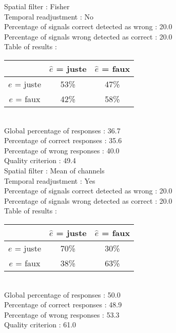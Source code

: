 Spatial filter : Fisher \\
Temporal readjustment : No \\
Percentage of signals correct detected as wrong :   20.0 \\
Percentage of signals wrong detected as correct :   20.0 \\
Table of results : \\
\begin{tabular}{|c|c|c|}
\hline				& $\hat{e}$ = juste & $\hat{e}$ = faux \\
\hline  $e$ = juste	&     53\%			&     47\%		\\
\hline  $e$ = faux	&     42\%			&     58\%		\\
\hline
\end{tabular}\\
Global percentage of responses :   36.7 \\
Percentage of correct responses :   35.6 \\
Percentage of wrong responses :   40.0 \\
Quality criterion :   49.4 \\

Spatial filter : Mean of channels \\
Temporal readjustment : Yes \\
Percentage of signals correct detected as wrong :   20.0 \\
Percentage of signals wrong detected as correct :   20.0 \\
Table of results : \\
\begin{tabular}{|c|c|c|}
\hline				& $\hat{e}$ = juste & $\hat{e}$ = faux \\
\hline  $e$ = juste	&     70\%			&     30\%		\\
\hline  $e$ = faux	&     38\%			&     63\%		\\
\hline
\end{tabular}\\
Global percentage of responses :   50.0 \\
Percentage of correct responses :   48.9 \\
Percentage of wrong responses :   53.3 \\
Quality criterion :   61.0 \\

